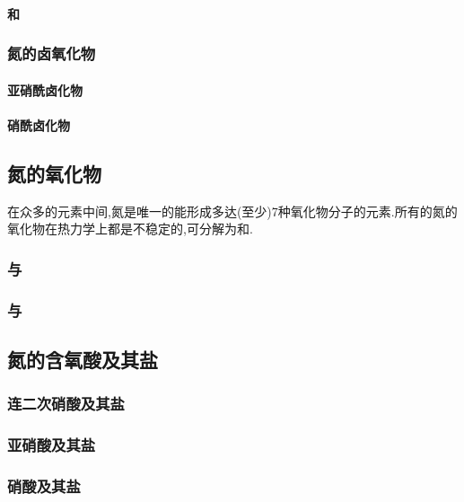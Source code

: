 \documentclass{ctexart}
\begin{document}
\paragraph{和}
\subsubsection{氮的卤氧化物}
\paragraph{亚硝酰卤化物}
\paragraph{硝酰卤化物}
\subsection{氮的氧化物}
在众多的元素中间,氮是唯一的能形成多达(至少)7种氧化物分子的元素.所有的氮的氧化物在热力学上都是不稳定的,可分解为和.
\subsubsection{}
\subsubsection{与}
\subsubsection{}
\subsubsection{与}
\subsubsection{}
\subsection{氮的含氧酸及其盐}
\subsubsection{连二次硝酸及其盐}
\subsubsection{亚硝酸及其盐}
\subsubsection{硝酸及其盐}
\end{document}
